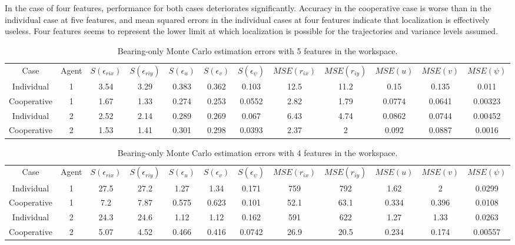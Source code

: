\documentclass{aiaa-tc}
\begin{document}
In the case of four features, performance for both cases deteriorates significantly. Accuracy in the cooperative case is worse than in the individual case at five features, and mean squared errors in the individual cases at four features indicate that localization is effectively useless. Four features seems to represent the lower limit at which localization is possible for the trajectories and variance levels assumed.

\begin{table}[tb!]
\scriptsize
\centering
\begin{tabular}{c|c|c|c|c|c|c|c|c|c|c|c|}
Case & Agent & $S(\epsilon_{rix})$ & $S(\epsilon_{riy})$ & $S(\epsilon_{u})$ & $S(\epsilon_{v})$ & $S(\epsilon_{\psi})$ & $MSE(r_{ix})$ & $MSE(r_{iy})$ & $MSE(u)$ & $MSE(v)$ & $MSE(\psi)$ \\
Individual & 1& 3.54& 3.29& 0.383& 0.362& 0.103& 12.5& 11.2& 0.15& 0.135& 0.011 \\
Cooperative & 1& 1.67& 1.33& 0.274& 0.253& 0.0552& 2.82& 1.79& 0.0774& 0.0641& 0.00323 \\
Individual & 2& 2.52& 2.14& 0.289& 0.269& 0.067& 6.43& 4.74& 0.0862& 0.0744& 0.00452 \\
Cooperative & 2& 1.53& 1.41& 0.301& 0.298& 0.0393& 2.37& 2& 0.092& 0.0887& 0.0016
\end{tabular}
\caption{Bearing-only Monte Carlo estimation errors with 5 features in the workspace.}
\label{tab:M_5_features}
\end{table}

\begin{table}[tb!]
\scriptsize
\centering
\begin{tabular}{c|c|c|c|c|c|c|c|c|c|c|c|}
Case & Agent & $S(\epsilon_{rix})$ & $S(\epsilon_{riy})$ & $S(\epsilon_{u})$ & $S(\epsilon_{v})$ & $S(\epsilon_{\psi})$ & $MSE(r_{ix})$ & $MSE(r_{iy})$ & $MSE(u)$ & $MSE(v)$ & $MSE(\psi)$ \\
Individual & 1& 27.5& 27.2& 1.27& 1.34& 0.171& 759& 792& 1.62& 2& 0.0299 \\
Cooperative & 1& 7.2& 7.87& 0.575& 0.623& 0.101& 52.1& 63.1& 0.334& 0.396& 0.0108 \\
Individual & 2& 24.3& 24.6& 1.12& 1.12& 0.162& 591& 622& 1.27& 1.33& 0.0263 \\
Cooperative & 2& 5.07& 4.52& 0.466& 0.416& 0.0742& 26.9& 20.5& 0.234& 0.174& 0.00557
\end{tabular}
\caption{Bearing-only Monte Carlo estimation errors with 4 features in the workspace.}
\label{tab:M_4_features}
\end{table}
\end{document}
